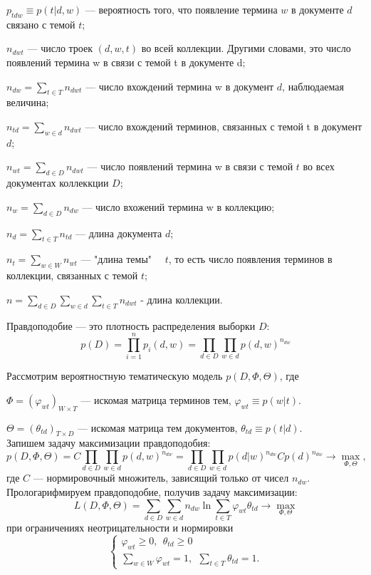 \documentclass[12pt]{article}
\renewcommand{\geq}{\geqslant}
\renewcommand{\phi}{\varphi}
\begin{document}
$p_{tdw} \equiv p(t|d,w)$ --- вероятность того, что появление термина $w$ в документе $d$ связано с темой $t$;

$n_{dwt}$ --- число троек $(d,w,t)$ во всей коллекции. Другими словами, это число появлений термина w в связи с темой t в документе d;

$n_{dw} = \sum_{t \in T} n_{dwt}$ --- число вхождений термина w в документ $d$,  наблюдаемая величина;

$n_{td} = \sum_{w \in d} n_{dwt}$ --- число вхождений  терминов, связанных с темой t в документ $d$;

$n_{wt} = \sum_{d \in D} n_{dwt}$ --- число появлений термина w в связи с темой $t$ во всех документах коллеккции $D$;

$n_{w} = \sum_{d \in D} n_{dw}$ --- число вхожений термина w в коллекцию;

$n_{d} = \sum_{t \in T} n_{td}$ --- длина документа $d$;

$n_{t} = \sum_{w \in W} n_{wt}$ --- "длина темы" \ \ $t$, то есть число появления терминов в коллекции, связанных с темой $t$;

$n = \sum_{d \in D}\sum_{w \in d}\sum_{t \in T} n_{dwt}$ - длина коллекции.

Правдоподобие ---  это плотность распределения выборки $D$:
\[
p(D)=\prod^n_{i=1}p_i(d,w)=\prod_{d \in D}\prod_{w \in d}p(d,w)^{n_{dw}}
\]

Рассмотрим вероятностную тематическую модель $p(D,\Phi,\Theta)$, где 

$\Phi=(\phi_{wt})_{W \times T}$ --- искомая матрица терминов тем, $\phi_{wt} \equiv p(w|t)$.

$\Theta=(\theta_{td})_{T \times D}$ --- искомая матрица тем документов, $\theta_{td}\equiv p(t|d)$.
\ \\
Запишем задачу максимизации правдоподобия:
\[
p(D,\Phi,\Theta)=C\prod_{d \in D}\prod_{w \in d}p(d,w)^{n_{dw}}=\prod_{d \in D}\prod_{w \in d}p(d|w)^{n_{dw}}Cp(d)^{n_{dw}} \to \max_{\Phi,\Theta},
\]
где $C$ --- нормировочный множитель, зависящий только от чисел $n_{dw}$. Прологарифмируем правдоподобие, получив задачу максимизации:
\[
L(D,\Phi,\Theta)=\sum_{d \in D}\sum_{w \in d}n_{dw}\ln\sum_{t \in T}\phi_{wt}\theta_{td} \to \max_{\Phi,\Theta}
\]
при ограничениях неотрицательности и нормировки
\[
\left\{
	\begin{aligned}
		\phi_{wt} \geq 0,~~\theta_{td} \geq 0\\
		\sum_{w \in W} \phi_{wt} = 1,~~\sum_{t \in T} \theta_{td}  = 1.
	\end{aligned}
\right.
\]
\end{document}
